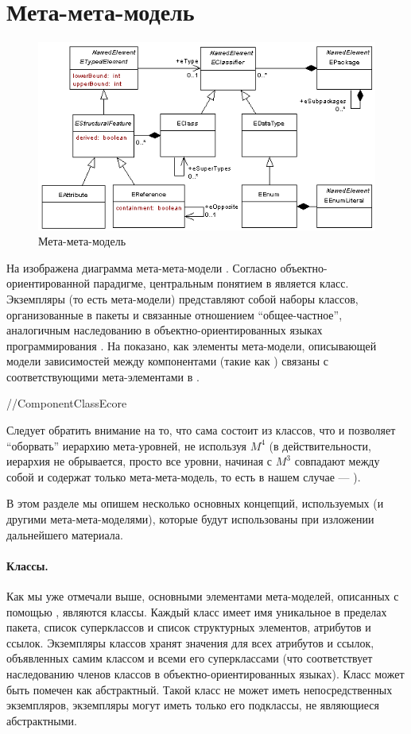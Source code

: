 \section{Мета-мета-модель }

\begin{figure}[htbp]
\centering
\includegraphics[width=\textwidth]{ecore.png}
\caption{Мета-мета-модель }\label{Ecore}
\end{figure}

На  изображена диаграмма мета-мета-модели . Согласно объектно-ориентированной парадигме, центральным понятием в  является класс. Экземпляры  (то есть мета-модели) представляют собой наборы классов, организованные в пакеты и связанные отношением ``общее-частное'', аналогичным наследованию в объектно-ориентированных языках программирования \cite{OOAD}. На  показано, как элементы мета-модели, описывающей модели зависимостей между компонентами (такие как ) связаны с соответствующими мета-элементами в .

//ComponentClassEcore

Следует обратить внимание на то, что  сама состоит из классов, что и позволяет ``оборвать'' иерархию мета-уровней, не используя $M^4$ (в действительности, иерархия не обрывается, просто все уровни, начиная с $M^3$ совпадают между собой и содержат только мета-мета-модель, то есть в нашем случае --- ).

В этом разделе мы опишем несколько основных концепций, используемых  (и другими мета-мета-моделями), которые будут использованы при изложении дальнейшего материала.

\paragraph*{Классы.} Как мы уже отмечали выше, основными элементами мета-моделей, описанных с помощью , являются классы. Каждый класс имеет имя уникальное в пределах пакета, список суперклассов и список структурных элементов, атрибутов и ссылок. Экземпляры классов хранят значения для всех атрибутов и ссылок, объявленных самим классом и всеми его суперклассами (что соответствует наследованию членов классов в объектно-ориентированных языках). Класс может быть помечен как абстрактный. Такой класс не может иметь непосредственных экземпляров, экземпляры могут иметь только его подклассы, не являющиеся абстрактными.

